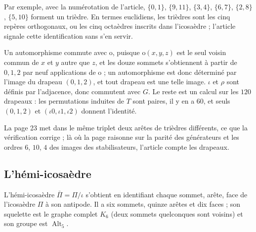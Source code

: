 \documentclass[11pt,a4paper]{amsart}
\theoremstyle{definition}
\theoremstyle{plain}
\theoremstyle{remark}
\newcommand{\Alt}{\operatorname{Alt}}
\begin{document}
Par exemple, avec la numérotation de l'article, $\{0,1\}$, $\{9,11\}$, $\{3,4\}$, $\{6,7\}$, $\{2,8\}$, $\{5,10\}$ forment un trièdre. En termes euclidiens, les trièdres sont les cinq repères orthogonaux, ou les cinq octaèdres inscrits dans l'icosaèdre ; l'article signale cette identification sans s'en servir.

Un automorphisme commute avec $\mathrm o$, puisque $\mathrm o(x, y, z)$ est le seul voisin commun de $x$ et $y$ autre que $z$, et les douze sommets s'obtiennent à partir de $0, 1, 2$ par neuf applications de $\mathrm o$ ; un automorphisme est donc déterminé par l'image du drapeau $(0, 1, 2)$, et tout drapeau est une telle image. $\iota$ et $\rho$ sont définis par l'adjacence, donc commutent avec $G$. Le reste est un calcul sur les $120$ drapeaux : les permutations induites de $T$ sont paires, il y en a $60$, et seuls $(0,1,2)$ et $(\iota0, \iota1, \iota2)$ donnent l'identité.

La page 23 met dans le même triplet deux arêtes de trièdres différents, ce que la vérification corrige ; là où la page raisonne sur la parité des générateurs et les ordres $6$, $10$, $4$ des images des stabilisateurs, l'article compte les drapeaux.

\subsection{L'hémi-icosaèdre}

L'hémi-icosaèdre $\bar\Pi = \Pi/\iota$ s'obtient en identifiant chaque sommet, arête, face de l'icosaèdre $\Pi$ à son antipode. Il a six sommets, quinze arêtes et dix faces ; son squelette est le graphe complet $K_6$ (deux sommets quelconques sont voisins) et son groupe est $\Alt_5$.
\end{document}
